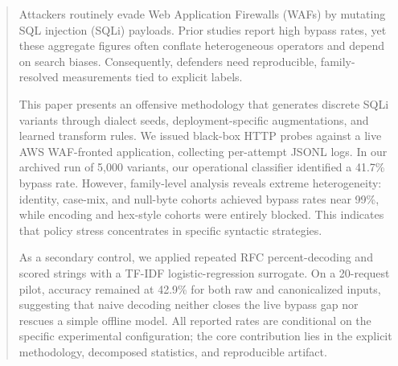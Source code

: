 \begin{abstract}
Attackers routinely evade Web Application Firewalls (WAFs) by mutating SQL injection (SQLi) payloads. Prior studies report high bypass rates, yet these aggregate figures often conflate heterogeneous operators and depend on search biases. Consequently, defenders need reproducible, family-resolved measurements tied to explicit labels.

This paper presents an offensive methodology that generates discrete SQLi variants through dialect seeds, deployment-specific augmentations, and learned transform rules. We issued black-box HTTP probes against a live AWS WAF-fronted application, collecting per-attempt JSONL logs. In our archived run of 5,000 variants, our operational classifier identified a 41.7\% bypass rate. However, family-level analysis reveals extreme heterogeneity: identity, case-mix, and null-byte cohorts achieved bypass rates near 99\%, while encoding and hex-style cohorts were entirely blocked. This indicates that policy stress concentrates in specific syntactic strategies.

As a secondary control, we applied repeated RFC percent-decoding and scored strings with a TF-IDF logistic-regression surrogate. On a 20-request pilot, accuracy remained at 42.9\% for both raw and canonicalized inputs, suggesting that naive decoding neither closes the live bypass gap nor rescues a simple offline model. All reported rates are conditional on the specific experimental configuration; the core contribution lies in the explicit methodology, decomposed statistics, and reproducible artifact.
\end{abstract}
